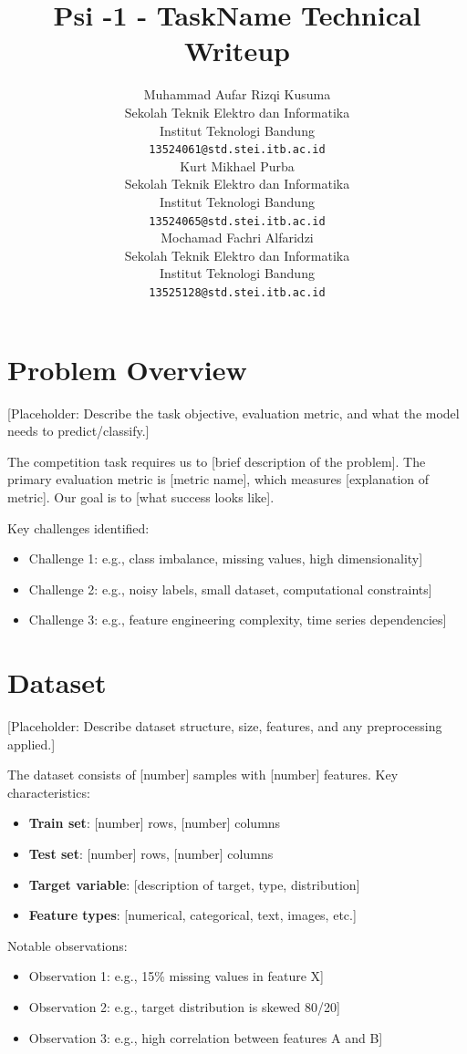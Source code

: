 \documentclass{article}
\title{\textbf{Psi -1 - TaskName Technical Writeup}}
\author{
Muhammad Aufar Rizqi Kusuma \\
Sekolah Teknik Elektro dan Informatika\\
Institut Teknologi Bandung\\
\texttt{13524061@std.stei.itb.ac.id} \\
\And
Kurt Mikhael Purba \\
Sekolah Teknik Elektro dan Informatika\\
Institut Teknologi Bandung\\
\texttt{13524065@std.stei.itb.ac.id} \\
\And
Mochamad Fachri Alfaridzi \\
Sekolah Teknik Elektro dan Informatika\\
Institut Teknologi Bandung\\
\texttt{13525128@std.stei.itb.ac.id} \\
}
\begin{document}
\maketitle

\section{Problem Overview}

 [Placeholder: Describe the task objective, evaluation metric, and what the model needs to predict/classify.]

The competition task requires us to [brief description of the problem]. The primary evaluation metric is [metric name], which measures [explanation of metric]. Our goal is to [what success looks like].

Key challenges identified:
\begin{itemize}
    \item Challenge 1: e.g., class imbalance, missing values, high dimensionality]
    \item Challenge 2: e.g., noisy labels, small dataset, computational constraints]
    \item Challenge 3: e.g., feature engineering complexity, time series dependencies]
\end{itemize}

\section{Dataset}

 [Placeholder: Describe dataset structure, size, features, and any preprocessing applied.]

The dataset consists of [number] samples with [number] features. Key characteristics:

\begin{itemize}
    \item \textbf{Train set}: [number] rows, [number] columns
    \item \textbf{Test set}: [number] rows, [number] columns
    \item \textbf{Target variable}: [description of target, type, distribution]
    \item \textbf{Feature types}: [numerical, categorical, text, images, etc.]
\end{itemize}

Notable observations:
\begin{itemize}
    \item Observation 1: e.g., 15\% missing values in feature X]
    \item Observation 2: e.g., target distribution is skewed 80/20]
    \item Observation 3: e.g., high correlation between features A and B]
\end{itemize}
\end{document}
